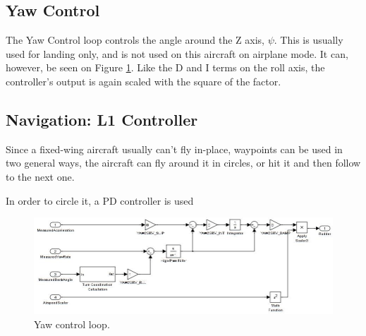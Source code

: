 \subsection{Yaw Control}
The Yaw Control loop controls the angle around the Z axis, $\psi$. This is usually used for landing only, and is not used on this aircraft on airplane mode. It can, however, be seen on Figure \ref{fig:yaw_loop}.
Like the D and I terms on the roll axis, the controller's output is again scaled with the square of the  factor.


\subsection{Navigation: L1 Controller}

%
%
Since a fixed-wing aircraft usually can't fly in-place, waypoints can be used in two general ways, the aircraft can fly around it in circles, or hit it and then follow to the next one.

In order to circle it, a PD controller is used


\begin{figure}[H]
\centering
  \includegraphics[width=\linewidth]{figs/yaw_control_loop.jpg}
  \caption{Yaw control loop.}
  \label{fig:yaw_loop}
\end{figure}
